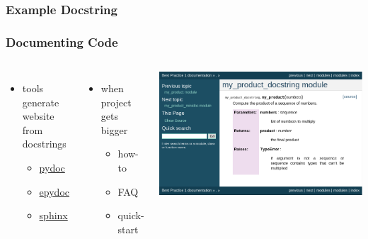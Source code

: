 \documentclass{beamer}
\begin{document}

\begin{frame}
 \frametitle{Example Docstring}
\end{frame}


\begin{frame}
 \frametitle{Documenting Code}

\begin{columns}[T]
\begin{itemize}
  \item tools generate website\\ from docstrings
\begin{itemize}
  \item \href{http://docs.python.org/library/pydoc.html}{pydoc}
  \item \href{http://epydoc.sourceforge.net/}{epydoc}
  \item \href{http://sphinx.pocoo.org/}{sphinx}
\end{itemize}
\end{itemize}

\begin{itemize}
  \item when project gets bigger
\begin{itemize}
  \item how-to 
  \item FAQ
  \item quick-start
\end{itemize}
\end{itemize}

\includegraphics[width=1\textwidth]{images/sphinxdoc.png}

\end{columns}
 
\end{frame}
\end{document}
